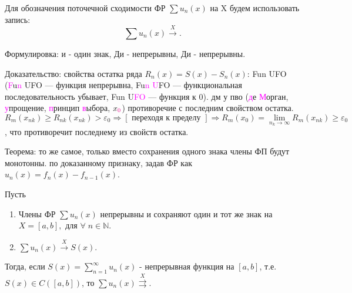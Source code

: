 \begin{col-answer-preambule}
	Для обозначения поточечной сходимости ФР $\sum u_n(x)$ на X будем использовать запись:
	\begin{equation}
	\label{eq:lecture01-14}
	\sum u_n(x) \overset{X}{\rightarrow}.
	\end{equation}
	\begin{plan}
		\item Формулировка: и - один знак, Ди - непрерывны, Ди - непрерывны.
		\item Доказательство:
		 свойства остатка ряда $R_n(x) = S(x) - S_n(x)$: Fun UFO (\textcolor{magenta}{F}u\textcolor{magenta}{n} UFO — функция непрерывна, Fu\textcolor{magenta}{n} \textcolor{magenta}{U}FO — функциональная последовательность убывает, Fun U\textcolor{magenta}{FO} — функция к 0).
		\subitem дм у пво (\textcolor{magenta}{д}е \textcolor{magenta}{М}орган, \textcolor{magenta}{у}прощение, \textcolor{magenta}{п}ринцип \textcolor{magenta}{в}ыбора, $x_{\textcolor{magenta}{0}}$)
		\subitem противоречие с последним свойством остатка.
		\subitem $R_{m} (x_{nk}) \geqslant R_{nk} (x_{nk}) > \varepsilon_0 \Rightarrow [\text{ переходя к пределу }] \Rightarrow R_m (x_0) = \lim\limits_{n_k \to \infty} R_m(x_{nk}) \geqslant \varepsilon_0$, что противоречит последнему из свойств остатка.
		\item Теорема: то же самое, только вместо сохранения одного знака члены ФП будут монотонны.
			\subitem по доказанному признаку, задав ФР как $u_n(x) = f_n(x) - f_{n-1}(x)$.
	\end{plan}
\end{col-answer-preambule}
\begin{theorem}
	Пусть
	\begin{enumerate}
		\item Члены ФР $\sum u_n(x)$ непрерывны и сохраняют один и тот же знак на $X = [a, b], \text{ для } \forall \; n \in \mathbb{N}$.
		\item $\sum u_n(x) \overset{X}{\to} S(x)$.
	\end{enumerate}
	Тогда, если $S(x) = \sum\limits_{n=1}^{\infty} u_n (x)$ - непрерывная функция на $[a, b]$, т.е. $S(x) \in C([a, b])$, то $\sum u_n(x) \overset{X}{\rightrightarrows}$.
\end{theorem}
